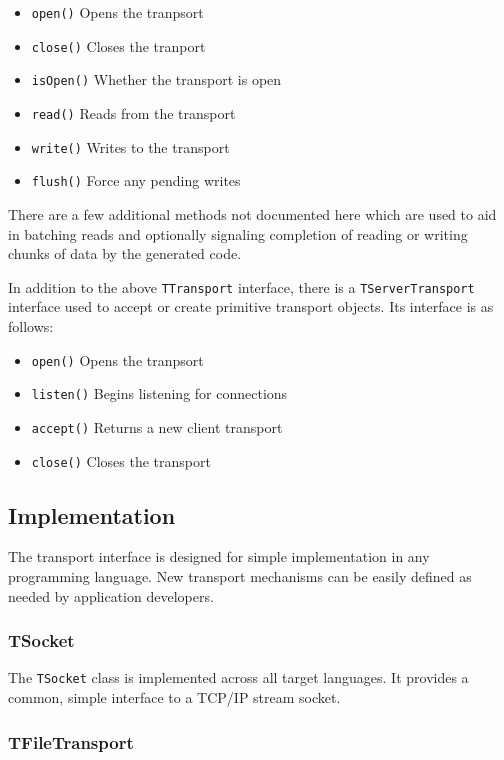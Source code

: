 \documentclass[nocopyrightspace,blockstyle]{sigplanconf}
\begin{document}
\begin{itemize}
\item \texttt{open()} Opens the tranpsort
\item \texttt{close()} Closes the tranport
\item \texttt{isOpen()} Whether the transport is open
\item \texttt{read()} Reads from the transport
\item \texttt{write()} Writes to the transport
\item \texttt{flush()} Force any pending writes
\end{itemize}

There are a few additional methods not documented here which are used to aid
in batching reads and optionally signaling completion of reading or writing
chunks of data by the generated code.

In addition to the above
\texttt{TTransport} interface, there is a \texttt{TServerTransport} interface
used to accept or create primitive transport objects. Its interface is as
follows:

\begin{itemize}
\item \texttt{open()} Opens the tranpsort
\item \texttt{listen()} Begins listening for connections
\item \texttt{accept()} Returns a new client transport
\item \texttt{close()} Closes the transport

\end{itemize}

\subsection{Implementation}

The transport interface is designed for simple implementation in any
programming language. New transport mechanisms can be easily defined as needed
by application developers.

\subsubsection{TSocket}

The \texttt{TSocket} class is implemented across all target languages. It
provides a common, simple interface to a TCP/IP stream socket.

\subsubsection{TFileTransport}
\end{document}
